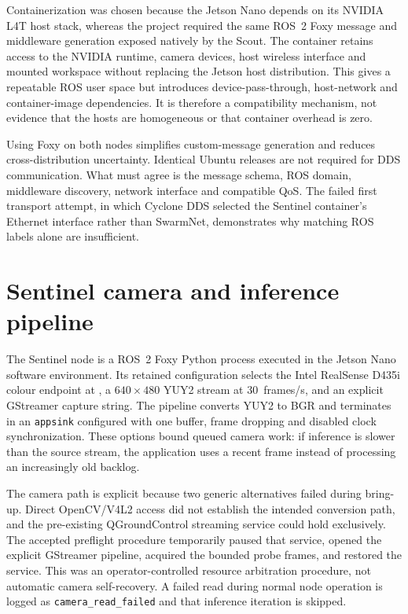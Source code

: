 Containerization was chosen because the Jetson Nano depends on its NVIDIA L4T
host stack, whereas the project required the same ROS~2 Foxy message and
middleware generation exposed natively by the Scout. The container retains
access to the NVIDIA runtime, camera devices, host wireless interface and
mounted workspace without replacing the Jetson host distribution. This gives a
repeatable ROS user space but introduces device-pass-through, host-network and
container-image dependencies. It is therefore a compatibility mechanism, not
evidence that the hosts are homogeneous or that container overhead is zero.

Using Foxy on both nodes simplifies custom-message generation and reduces
cross-distribution uncertainty. Identical Ubuntu releases are not required for
DDS communication. What must agree is the message schema, ROS domain,
middleware discovery, network interface and compatible QoS. The failed first
transport attempt, in which Cyclone DDS selected the Sentinel container's
Ethernet interface rather than SwarmNet, demonstrates why matching ROS labels
alone are insufficient.

\section{Sentinel camera and inference pipeline}
\label{sec:implementation:sentinel}

The Sentinel node is a ROS~2 Foxy Python process executed in the Jetson Nano
software environment. Its retained configuration selects the Intel RealSense
D435i colour endpoint at , a $640\times480$ YUY2 stream at
30~frames/s, and an explicit GStreamer capture string. The pipeline converts
YUY2 to BGR and terminates in an \texttt{appsink} configured with one buffer,
frame dropping and disabled clock synchronization. These options bound queued
camera work: if inference is slower than the source stream, the application
uses a recent frame instead of processing an increasingly old backlog.

The camera path is explicit because two generic alternatives failed during
bring-up. Direct OpenCV/V4L2 access did not establish the intended conversion
path, and the pre-existing QGroundControl streaming service could hold
 exclusively. The accepted preflight procedure temporarily
paused that service, opened the explicit GStreamer pipeline, acquired the
bounded probe frames, and restored the service. This was an operator-controlled
resource arbitration procedure, not automatic camera self-recovery. A failed
read during normal node operation is logged as \texttt{camera\_read\_failed}
and that inference iteration is skipped.

